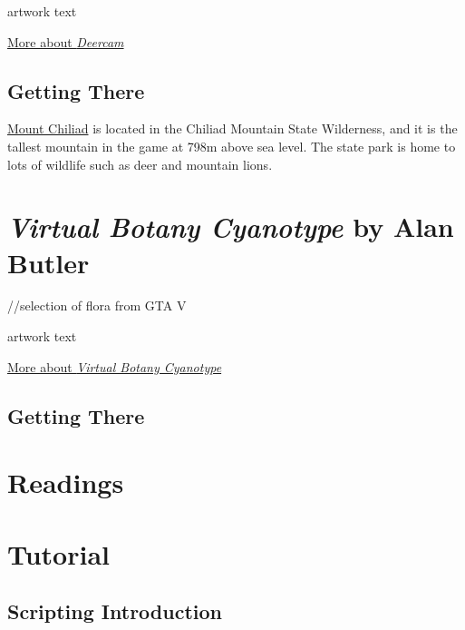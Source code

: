 \documentclass[
  openany]{book}
\begin{document}
artwork text

\href{https://bwatanabe.com/GTA_V_WanderingDeer.html}{More about \emph{Deercam}}

\hypertarget{getting-there-5}{%
\subsection*{Getting There}\label{getting-there-5}}

\href{https://grandtheftdata.com/landmarks/\#86.534,6158.577,4,atlas,name=mount_chiliad,Mount_Chiliad}{Mount Chiliad} is located in the Chiliad Mountain State Wilderness, and it is the tallest mountain in the game at 798m above sea level. The state park is home to lots of wildlife such as deer and mountain lions.

\hypertarget{virtual-botany-cyanotype-by-alan-butler}{%
\section*{\texorpdfstring{\emph{Virtual Botany Cyanotype} by Alan Butler}{Virtual Botany Cyanotype by Alan Butler}}\label{virtual-botany-cyanotype-by-alan-butler}}

//selection of flora from GTA V

artwork text

\href{http://www.alanbutler.info/virtual-botany-cyanotypes}{More about \emph{Virtual Botany Cyanotype}}

\hypertarget{getting-there-6}{%
\subsection*{Getting There}\label{getting-there-6}}

\hypertarget{readings-3}{%
\section*{Readings}\label{readings-3}}

\hypertarget{tutorial-3}{%
\section*{Tutorial}\label{tutorial-3}}

\hypertarget{scripting-introduction}{%
\subsection*{Scripting Introduction}\label{scripting-introduction}}
\end{document}
